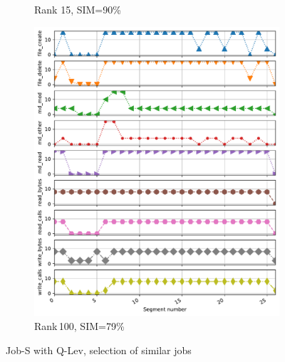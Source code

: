 \documentclass{jhps}
\begin{document}
\begin{figure}[bt]
\begin{subfigure}{0.3\textwidth}
\caption{Rank 15, SIM=90\%}
\end{subfigure}
\begin{subfigure}{0.3\textwidth}
\centering
\includegraphics[width=\textwidth]{job_similarities_4296426-out/hex_lev-0.7901--99timeseries4297842}
\caption{Rank\,100, SIM=79\%}
\end{subfigure}

\caption{Job-S with Q-Lev, selection of similar jobs}%
\label{fig:job-S-hex-lev}
\end{figure}

%
\end{document}
